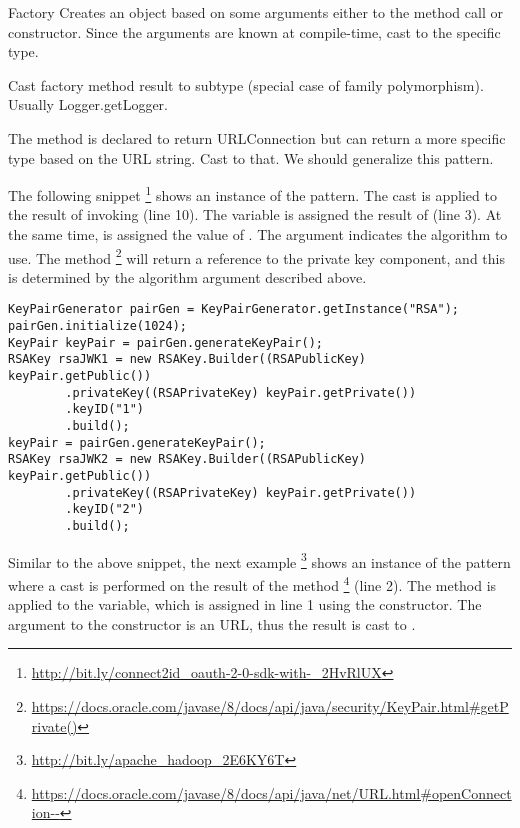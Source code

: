 \begin{pattern}{Factory}
Creates an object based on some arguments either to the method call or constructor.
Since the arguments are known at compile-time, cast to the specific type.

Cast factory method result to subtype (special case of family polymorphism).
Usually Logger.getLogger.

The method is declared to return URLConnection but can return a more specific type based on the URL string.
Cast to that.
We should generalize this pattern.
%

\instances{}
The following snippet%
\footnote{\url{http://bit.ly/connect2id_oauth-2-0-sdk-with-_2HvRlUX}}
shows an instance of the \thisp{} pattern.
The cast is applied to the result of invoking 
(line 10).
The variable  is assigned the result of  (line 3).
At the same time,  is assigned the value of .
The argument  indicates the algorithm to use.
%
%
The method%
\footnote{\url{https://docs.oracle.com/javase/8/docs/api/java/security/KeyPair.html\#getPrivate()}}
will return a reference to the private key component,
and this is determined by the algorithm argument described above.

\begin{verbatim}
KeyPairGenerator pairGen = KeyPairGenerator.getInstance("RSA");
pairGen.initialize(1024);
KeyPair keyPair = pairGen.generateKeyPair();
RSAKey rsaJWK1 = new RSAKey.Builder((RSAPublicKey) keyPair.getPublic())
        .privateKey((RSAPrivateKey) keyPair.getPrivate())
        .keyID("1")
        .build();
keyPair = pairGen.generateKeyPair();
RSAKey rsaJWK2 = new RSAKey.Builder((RSAPublicKey) keyPair.getPublic())
        .privateKey((RSAPrivateKey) keyPair.getPrivate())
        .keyID("2")
        .build();
\end{verbatim}

Similar to the above snippet, the next example%
\footnote{\url{http://bit.ly/apache_hadoop_2E6KY6T}}
shows an instance of the \thisp{} pattern where a cast is performed on the result of the  method%
\footnote{\url{https://docs.oracle.com/javase/8/docs/api/java/net/URL.html\#openConnection--}}
(line 2).
The  method is applied to the  variable,
which is assigned in line 1 using the  constructor.
The argument to the constructor is an  URL,
thus the result is cast to .


\end{pattern}
